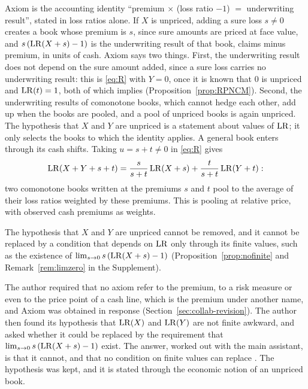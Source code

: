 Axiom \axR{} is the accounting identity ``premium $\times$ (loss ratio $-1$) $=$ underwriting result'', stated in
loss ratios alone. If $X$ is unpriced, adding a sure loss $s\ne0$ creates a book whose premium is $s$, since sure
amounts are priced at face value, and $s\,(\mathrm{LR}(X+s)-1)$ is the underwriting result of that book, claims minus
premium, in units of cash. Axiom \axR{} says two things. First, the underwriting result does not depend on the sure
amount added, since a sure loss carries no underwriting result: this is \eqref{eq:R} with $Y=0$, once it is known
that $0$ is unpriced and $\mathrm{LR}(t)=1$, both of which \axR{} implies (Proposition~\ref{prop:RPNCM}). Second, the
underwriting results of comonotone books, which cannot hedge each other, add up when the books are pooled, and a
pool of unpriced books is again unpriced. The hypothesis that $X$ and $Y$ are unpriced is a statement about values
of $\mathrm{LR}$; it only selects the books to which the identity applies. A general book enters through its cash shifts.
Taking $u=s+t\ne0$ in \eqref{eq:R} gives
\begin{equation}\label{eq:Ravg}
 \mathrm{LR}(X+Y+s+t)=\frac{s}{s+t}\,\mathrm{LR}(X+s)+\frac{t}{s+t}\,\mathrm{LR}(Y+t):
\end{equation}
two comonotone books written at the premiums $s$ and $t$ pool to the average of their loss ratios weighted by these
premiums. This is pooling at relative price, with observed cash premiums as weights.

The hypothesis that $X$ and $Y$ are unpriced cannot be removed, and it cannot be replaced by a condition that
depends on $\mathrm{LR}$ only through its finite values, such as the existence of $\lim_{s\to0}s\,(\mathrm{LR}(X+s)-1)$
(Proposition~\ref{prop:nofinite} and Remark~\ref{rem:limzero} in the Supplement).

\begin{discussion}
The author required that no axiom refer to the premium, to a risk measure or even to the price point of a cash
line, which is the premium under another name, and Axiom \axR{} was obtained in response
(Section~\ref{sec:collab-revision}). The author then found its hypothesis that $\mathrm{LR}(X)$ and $\mathrm{LR}(Y)$ are not finite
awkward, and asked whether it could be replaced by the requirement that $\lim_{s\to0}s\,(\mathrm{LR}(X+s)-1)$ exist. The
answer, worked out with the main assistant, is that it cannot, and that no condition on finite values can replace
\axR. The hypothesis was kept, and it is stated through the economic notion of an unpriced book.
\end{discussion}

